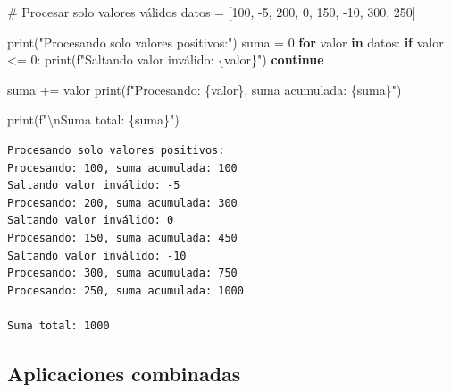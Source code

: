 \documentclass[
  doc,
  floatsintext,
  longtable,
  a4paper,
  nolmodern,
  notxfonts,
  notimes,
  12pt,
  colorlinks=true,linkcolor=blue,citecolor=blue,urlcolor=blue]{apa7}
\newenvironment{Shaded}{\begin{snugshade}}{\end{snugshade}}
\newcommand{\BuiltInTok}[1]{\textcolor[rgb]{0.00,0.23,0.31}{#1}}
\newcommand{\CharTok}[1]{\textcolor[rgb]{0.13,0.47,0.30}{#1}}
\newcommand{\CommentTok}[1]{\textcolor[rgb]{0.37,0.37,0.37}{#1}}
\newcommand{\ControlFlowTok}[1]{\textcolor[rgb]{0.00,0.23,0.31}{\textbf{#1}}}
\newcommand{\DecValTok}[1]{\textcolor[rgb]{0.68,0.00,0.00}{#1}}
\newcommand{\KeywordTok}[1]{\textcolor[rgb]{0.00,0.23,0.31}{\textbf{#1}}}
\newcommand{\NormalTok}[1]{\textcolor[rgb]{0.00,0.23,0.31}{#1}}
\newcommand{\OperatorTok}[1]{\textcolor[rgb]{0.37,0.37,0.37}{#1}}
\newcommand{\SpecialCharTok}[1]{\textcolor[rgb]{0.37,0.37,0.37}{#1}}
\newcommand{\SpecialStringTok}[1]{\textcolor[rgb]{0.13,0.47,0.30}{#1}}
\newcommand{\StringTok}[1]{\textcolor[rgb]{0.13,0.47,0.30}{#1}}
\begin{document}
\begin{Shaded}
\begin{Highlighting}[]
\CommentTok{\# Procesar solo valores válidos}
\NormalTok{datos }\OperatorTok{=}\NormalTok{ [}\DecValTok{100}\NormalTok{, }\OperatorTok{{-}}\DecValTok{5}\NormalTok{, }\DecValTok{200}\NormalTok{, }\DecValTok{0}\NormalTok{, }\DecValTok{150}\NormalTok{, }\OperatorTok{{-}}\DecValTok{10}\NormalTok{, }\DecValTok{300}\NormalTok{, }\DecValTok{250}\NormalTok{]}

\BuiltInTok{print}\NormalTok{(}\StringTok{"Procesando solo valores positivos:"}\NormalTok{)}
\NormalTok{suma }\OperatorTok{=} \DecValTok{0}
\ControlFlowTok{for}\NormalTok{ valor }\KeywordTok{in}\NormalTok{ datos:}
    \ControlFlowTok{if}\NormalTok{ valor }\OperatorTok{\textless{}=} \DecValTok{0}\NormalTok{:}
        \BuiltInTok{print}\NormalTok{(}\SpecialStringTok{f"Saltando valor inválido: }\SpecialCharTok{\{}\NormalTok{valor}\SpecialCharTok{\}}\SpecialStringTok{"}\NormalTok{)}
        \ControlFlowTok{continue}
    
\NormalTok{    suma }\OperatorTok{+=}\NormalTok{ valor}
    \BuiltInTok{print}\NormalTok{(}\SpecialStringTok{f"Procesando: }\SpecialCharTok{\{}\NormalTok{valor}\SpecialCharTok{\}}\SpecialStringTok{, suma acumulada: }\SpecialCharTok{\{}\NormalTok{suma}\SpecialCharTok{\}}\SpecialStringTok{"}\NormalTok{)}

\BuiltInTok{print}\NormalTok{(}\SpecialStringTok{f"}\CharTok{\textbackslash{}n}\SpecialStringTok{Suma total: }\SpecialCharTok{\{}\NormalTok{suma}\SpecialCharTok{\}}\SpecialStringTok{"}\NormalTok{)}
\end{Highlighting}
\end{Shaded}

\begin{verbatim}
Procesando solo valores positivos:
Procesando: 100, suma acumulada: 100
Saltando valor inválido: -5
Procesando: 200, suma acumulada: 300
Saltando valor inválido: 0
Procesando: 150, suma acumulada: 450
Saltando valor inválido: -10
Procesando: 300, suma acumulada: 750
Procesando: 250, suma acumulada: 1000

Suma total: 1000
\end{verbatim}

\subsection{Aplicaciones combinadas}\label{aplicaciones-combinadas}
\end{document}
